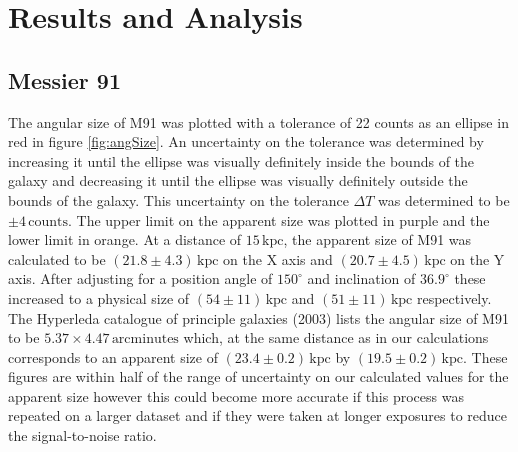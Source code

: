 \documentclass[%
reprint,
amsmath,amssymb,
aps,
]{revtex4-2}
\begin{document}
	\section{Results and Analysis}
	
		\subsection{Messier 91}
		
			The angular size of M91 was plotted with a tolerance of 22 counts as an ellipse in red in figure \ref{fig:angSize}. An uncertainty on the tolerance was determined by increasing it until the ellipse was visually definitely inside the bounds of the galaxy and decreasing it until the ellipse was visually definitely outside the bounds of the galaxy. This uncertainty on the tolerance $\Delta T$ was determined to be $\pm 4 \,\text{counts}$. The upper limit on the apparent size was plotted in purple and the lower limit in orange. At a distance of $15\,\text{kpc}$, the apparent size of M91 was calculated to be $\left(21.8 \pm 4.3\right) \,\text{kpc}$ on the X axis and $\left(20.7 \pm 4.5\right) \,\text{kpc}$ on the Y axis. After adjusting for a position angle of $150^\circ$ and inclination of $36.9^\circ$ these increased to a physical size of $\left(54 \pm 11\right) \,\text{kpc}$ and $\left(51 \pm 11\right) \,\text{kpc}$ respectively. The Hyperleda catalogue of principle galaxies (2003)\cite{hyperleda} lists the angular size of M91 to be $5.37 \times 4.47\,\text{arcminutes}$ which, at the same distance as in our calculations corresponds to an apparent size of $\left(23.4 \pm 0.2\right) \,\text{kpc}$ by $\left(19.5 \pm 0.2\right) \,\text{kpc}$. These figures are within half of the range of uncertainty on our calculated values for the apparent size however this could become more accurate if this process was repeated on a larger dataset and if they were taken at longer exposures to reduce the signal-to-noise ratio.
			
\end{document}
